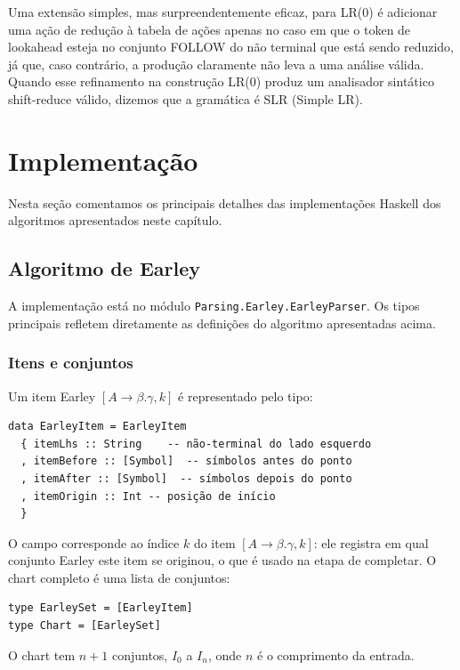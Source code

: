 Uma extensão simples, mas surpreendentemente eficaz, para LR(0) é
adicionar uma ação de redução à tabela de ações apenas no caso em que
o token de lookahead esteja no conjunto FOLLOW do não terminal que
está sendo reduzido, já que, caso contrário, a produção claramente
não leva a uma análise válida. Quando esse refinamento na construção
LR(0) produz um analisador sintático shift-reduce válido, dizemos que
a gramática é SLR (Simple LR).

\section{Implementação}

Nesta seção comentamos os principais detalhes das implementações
Haskell dos algoritmos apresentados neste capítulo.

\subsection{Algoritmo de Earley}

A implementação está no módulo
\verb|Parsing.Earley.EarleyParser|. Os tipos
principais refletem diretamente as definições do algoritmo apresentadas acima.

\subsubsection{Itens e conjuntos}

Um item Earley \([A \to \beta . \gamma, k]\) é representado pelo tipo:

\begin{verbatim}
data EarleyItem = EarleyItem
  { itemLhs :: String    -- não-terminal do lado esquerdo
  , itemBefore :: [Symbol]  -- símbolos antes do ponto
  , itemAfter :: [Symbol]  -- símbolos depois do ponto
  , itemOrigin :: Int -- posição de início
  }
\end{verbatim}

O campo  corresponde ao índice
\(k\) do item \([A \to \beta.\gamma, k]\): ele registra em qual
conjunto Earley este item se originou, o que é usado na etapa de
completar. O chart completo é uma lista de conjuntos:

\begin{verbatim}
type EarleySet = [EarleyItem]
type Chart = [EarleySet]
\end{verbatim}

O chart tem \(n + 1\) conjuntos, \(I_0\) a \(I_n\), onde \(n\) é o
comprimento da entrada.

